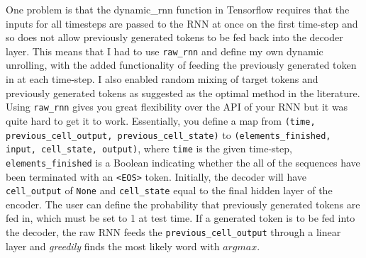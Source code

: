 \documentclass[]{article}
\begin{document}
One problem is that the dynamic\_rnn function in Tensorflow requires that the inputs for all timesteps are passed to the RNN at once on the first time-step and so does not allow previously generated tokens to be fed back into the decoder layer. This means that I had to use \lstinline{raw_rnn} and define my own dynamic unrolling, with the added functionality of feeding the previously generated token in at each time-step. I also enabled random mixing of target tokens and previously generated tokens as suggested as the optimal method in the literature. Using \lstinline{raw_rnn} gives you great flexibility over the API of your RNN but it was quite hard to get it to work. Essentially, you define a map from \lstinline{(time, previous_cell_output, previous_cell_state)}
to \lstinline{(elements_finished, input, cell_state, output)}, where \lstinline{time} is the given time-step, \lstinline{elements_finished} is a Boolean indicating whether the all of the sequences have been terminated with an \lstinline{<EOS>} token. Initially, the decoder will have \lstinline{cell_output} of \lstinline{None} and \lstinline{cell_state} equal to the final hidden layer of the encoder. The user can define the probability that previously generated tokens are fed in, which must be set to 1 at test time. If a generated token is to be fed into the decoder, the raw RNN feeds the \lstinline{previous_cell_output} through a linear layer and \textit{greedily} finds the most likely word with $argmax$.
\end{document}
